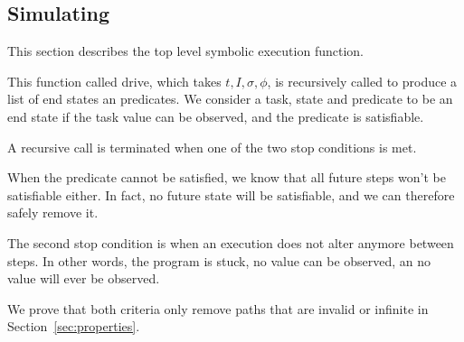 \subsection{Simulating}
\label{subsec:driving}

This section describes the top level symbolic execution function.

This function called drive, which takes $t,I,\sigma,\phi$, is recursively called to produce a list of end states an predicates.
We consider a task, state and predicate to be an end state if the task value can be observed, and the predicate is satisfiable.

A recursive call is terminated when one of the two stop conditions is met.

When the predicate cannot be satisfied, we know that all future steps won't be satisfiable either.
In fact, no future state will be satisfiable, and we can therefore safely remove it.

The second stop condition is when an execution does not alter anymore between steps.
In other words, the program is stuck, no value can be observed, an no value will ever be observed.

We prove that both criteria only remove paths that are invalid or infinite in Section~\ref{sec:properties}.


